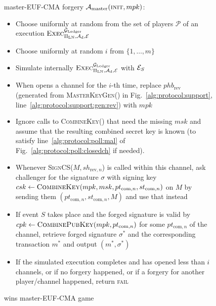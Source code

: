   \begin{figure}[!htbp]
    \begin{algobox}{\textsf{master-EUF-CMA} forgery}
      $\mathcal{A}_{\mathrm{master}}(\textsc{init}, mpk)$:
      \begin{itemize}
        \item Choose uniformly at random \alice{} from the set of players
        $\mathcal{P}$ of an execution
        $\textsc{Exec}^{\mathcal{G}_{\mathrm{Ledger}}}_{\Pi_{\mathrm{LN}}, \mathcal{A}_{\mathrm{d}},
        \mathcal{E}}$
        \item Choose uniformly at random $i$ from $\{1, \dots, m\}$
        \item Simulate internally
        $\textsc{Exec}^{\mathcal{G}_{\mathrm{Ledger}}}_{\Pi_{\mathrm{LN}}, \mathcal{A}_{\mathrm{d}},
        \mathcal{E}}$ with $\mathcal{E}_S$
        \item When \alice{} opens a channel for the $i$-th time,
        replace $phb_{\mathrm{rev}}$ (generated from \textsc{MasterKeyGen}() in
        Fig.~\ref{alg:protocol:support},
        line~\ref{alg:protocol:support:gen:rev}) with $mpk$
        \item Ignore calls to \textsc{CombineKey}() that need the missing $msk$
        and assume that the resulting combined secret key is known (to satisfy
        line~\ref{alg:protocol:poll:mal} of
        Fig.~\ref{alg:protocol:poll:closedch} if needed).
        \item Whenever \textsc{SignCS}($M, sh_{\mathrm{rev}, n}$) is called
        within this channel, ask challenger for the signature $\sigma$ with
        signing key $csk \gets \textsc{CombineKey}(mpk, msk, pt_{\mathrm{com},
        n}, st_{\mathrm{com}, n})$ on $M$ by sending them $(pt_{\mathrm{com},
        n}, st_{\mathrm{com}, n}, M)$ and use that instead
        \item If event $S$ takes place and the forged signature is valid by $cpk
        \gets \textsc{CombinePubKey}(mpk, pt_{\mathrm{com}, n})$ for some
        $pt_{\mathrm{com}, n}$ of the channel, retrieve forged signature
        $\sigma^*$ and the corresponding transaction $m^*$ and output $(m^*,
        \sigma^*)$
        \item If the simulated execution completes and \alice{} has opened less
        than $i$ channels, or if no forgery happened, or if a forgery for
        another player/channel happened, return \textsc{fail}
      \end{itemize}
    \end{algobox}
    \caption{wins \textsf{master-EUF-CMA} game}
    \label{alg:forge:master}
  \end{figure}

